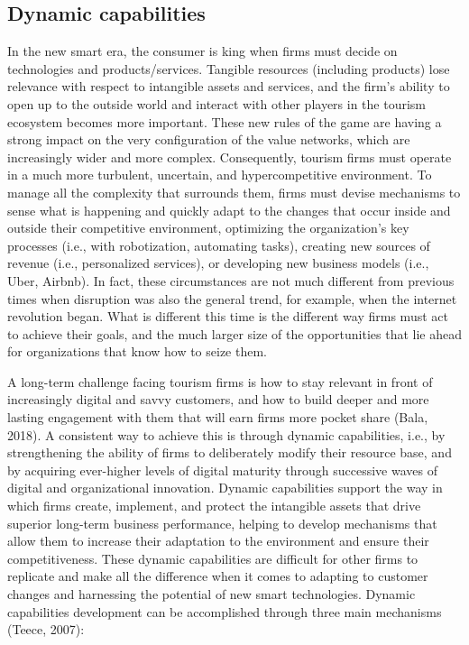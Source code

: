 \documentclass[
  letterpaper,
  DIV=11,
  numbers=noendperiod]{scrreprt}
\begin{document}
\hypertarget{dynamic-capabilities}{%
\subsection{Dynamic capabilities}\label{dynamic-capabilities}}

In the new smart era, the consumer is king when firms must decide on
technologies and products/services. Tangible resources (including
products) lose relevance with respect to intangible assets and services,
and the firm's ability to open up to the outside world and interact with
other players in the tourism ecosystem becomes more important. These new
rules of the game are having a strong impact on the very configuration
of the value networks, which are increasingly wider and more complex.
Consequently, tourism firms must operate in a much more turbulent,
uncertain, and hypercompetitive environment. To manage all the
complexity that surrounds them, firms must devise mechanisms to sense
what is happening and quickly adapt to the changes that occur inside and
outside their competitive environment, optimizing the organization's key
processes (i.e., with robotization, automating tasks), creating new
sources of revenue (i.e., personalized services), or developing new
business models (i.e., Uber, Airbnb). In fact, these circumstances are
not much different from previous times when disruption was also the
general trend, for example, when the internet revolution began. What is
different this time is the different way firms must act to achieve their
goals, and the much larger size of the opportunities that lie ahead for
organizations that know how to seize them.

A long-term challenge facing tourism firms is how to stay relevant in
front of increasingly digital and savvy customers, and how to build
deeper and more lasting engagement with them that will earn firms more
pocket share (Bala, 2018). A consistent way to achieve this is through
dynamic capabilities, i.e., by strengthening the ability of firms to
deliberately modify their resource base, and by acquiring ever-higher
levels of digital maturity through successive waves of digital and
organizational innovation. Dynamic capabilities support the way in which
firms create, implement, and protect the intangible assets that drive
superior long-term business performance, helping to develop mechanisms
that allow them to increase their adaptation to the environment and
ensure their competitiveness. These dynamic capabilities are difficult
for other firms to replicate and make all the difference when it comes
to adapting to customer changes and harnessing the potential of new
smart technologies. Dynamic capabilities development can be accomplished
through three main mechanisms (Teece, 2007):
\end{document}
